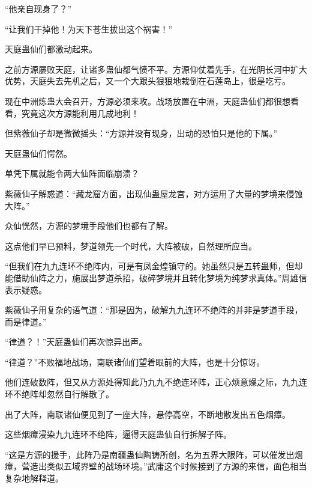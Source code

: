 \begin{this_body}
“他亲自现身了？”

“让我们干掉他！为天下苍生拔出这个祸害！”

天庭蛊仙们都激动起来。

之前方源屡败天庭，让诸多蛊仙都气愤不平。方源仰仗着先手，在光阴长河中扩大优势，天庭失去先机之后，又一个大跟头狠狠地栽倒在石莲岛上，很是吃亏。

现在中洲炼蛊大会召开，方源必须来攻。战场放置在中洲，天庭蛊仙们都很想看看，究竟这次方源能利用几成地利！

但紫薇仙子却是微微摇头：“方源并没有现身，出动的恐怕只是他的下属。”

天庭蛊仙们愕然。

单凭下属就能令两大仙阵面临崩溃？

紫薇仙子解惑道：“藏龙窟方面，出现仙蛊屋龙宫，对方运用了大量的梦境来侵蚀大阵。”

众仙恍然，方源的梦境手段他们也都有了解。

这点他们早已预料，梦道领先一个时代，大阵被破，自然理所应当。

“但我们在九九连环不绝阵内，可是有凤金煌镇守的。她虽然只是五转蛊师，但却能借助仙阵之力，施展出梦道杀招，破碎梦境并且转化梦境为纯梦求真体。”周雄信表示疑惑。

紫薇仙子用复杂的语气道：“那是因为，破解九九连环不绝阵的并非是梦道手段，而是律道。”

“律道？！”天庭蛊仙们再次惊异出声。

“律道？”不败福地战场，南联诸仙们望着眼前的大阵，也是十分惊讶。

他们连破数阵，但又从方源处得知此乃九九不绝连环阵，正心烦意燥之际，九九连环不绝阵却忽然自行解散了。

出了大阵，南联诸仙便见到了一座大阵，悬停高空，不断地散发出五色烟瘴。

这些烟瘴浸染九九连环不绝阵，逼得天庭蛊仙自行拆解子阵。

“这是方源的援手，此阵乃是南疆蛊仙陶铸所创，名为五界大限阵，可以催发出烟瘴，营造出类似五域界壁的战场环境。”武庸这个时候接到了方源的来信，面色相当复杂地解释道。

\end{this_body}

